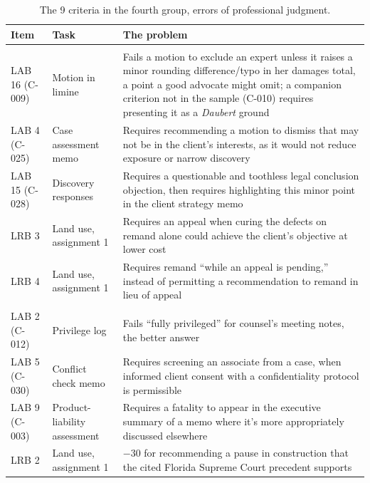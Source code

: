 \documentclass[11pt]{article}
\newcommand{\auditJudgmentDefects}{9}
\begin{document}
\begin{table}[htbp]
\centering
{\footnotesize
\begin{tabular}{@{}>{\raggedright\arraybackslash}p{.16\linewidth}>{\raggedright\arraybackslash}p{.19\linewidth}>{\raggedright\arraybackslash}p{.59\linewidth}@{}}
\toprule
Item & Task & The problem\\
\midrule
\multicolumn{3}{@{}l}{\textit{Work whose cost exceeds its value}}\\
LAB 16 (C-009) & Motion in limine & Fails a motion to exclude an expert unless it raises a minor rounding difference/typo in her damages total, a point a good advocate might omit; a companion criterion not in the sample (C-010) requires presenting it as a \emph{Daubert} ground\\
LAB 4 (C-025) & Case assessment memo & Requires recommending a motion to dismiss that may not be in the client's interests, as it would not reduce exposure or narrow discovery\\
LAB 15 (C-028) & Discovery responses & Requires a questionable and toothless legal conclusion objection, then requires highlighting this minor point in the client strategy memo\\
LRB 3 & Land use, assignment 1 & Requires an appeal when curing the defects on remand alone could achieve the client's objective at lower cost\\
LRB 4 & Land use, assignment 1 & Requires remand ``while an appeal is pending,'' instead of permitting a recommendation to remand in lieu of appeal\\
\addlinespace
\multicolumn{3}{@{}l}{\textit{One reasonable choice made mandatory}}\\
LAB 2 (C-012) & Privilege log & Fails ``fully privileged'' for counsel's meeting notes, the better answer\\
LAB 5 (C-030) & Conflict check memo & Requires screening an associate from a case, when informed client consent with a confidentiality protocol is permissible\\
LAB 9 (C-003) & Product-liability assessment & Requires a fatality to appear in the executive summary of a memo where it's more appropriately discussed elsewhere\\
LRB 2 & Land use, assignment 1 & $-$30 for recommending a pause in construction that the cited Florida Supreme Court precedent supports\\
\bottomrule
\end{tabular}}
\caption{The \auditJudgmentDefects{} criteria in the fourth group, errors of professional judgment.}
\label{tab:strategy}
\end{table}
\end{document}
